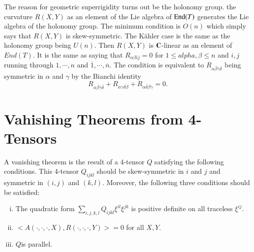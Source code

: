 The reason for geometric superrigidity turns out be the holonomy group. the curvature $R(X, Y)$ as an element of the Lie algebra of $\operatorname{End}(T)$ generates the Lie algebra of the holonomy group. The minimum condition is $O(n)$ which simply says that $R(X, Y)$ is skew-symmetric. The K\"ahler case is the same as the holonomy group being $U(n)$. Then $R(X, Y)$ is $\mathbf{C}$-linear as an element of $End(T)$. It is the same as saying that $R_{\alpha \beta ij}=0$ for $1 \leq alpha, \beta \leq n$ and $i ,j$ running through $1, \cdots, n$ and $\overline{1}, \cdots, \overline{n}$. The condition is equivalent to $R_{\alpha \overline{\beta}\gamma\overline{\delta}}$ being symmetric in $\alpha$ and $\gamma$ by the Bianchi identity
$$
R_{\alpha  \overline{\beta} \gamma \overline{\delta}} + R_{\alpha \gamma \overline{\delta}\beta} + R_{\alpha \overline{\delta}\beta \gamma} = 0.
$$

\section*{Vahishing Theorems from 4-Tensors}

A vanishing theorem is the result of a 4-tensor $Q$ satisfying the following conditions. This 4-tensor $Q_{ijkl}$ should be skew-symmetric in $i$ and $j$ and symmetric in $(i,j)$ and $(k, l)$. Moreover, the following three conditions should be satisfied:
\begin{enumerate}[(i)]
\item The quadratic form $\sum_{i,j,k,l} Q_{ijkl}\xi^{il} \xi^{jk}$ is positive definite on all traceless $\xi^{ij}$.\label{chap16-enum-i}

\item $< A(\cdot,\cdot,\cdot, X), R(\cdot,\cdot,\cdot, Y) > = 0$ for all $X, Y$.\label{chap16-enum-ii}

\item $Q$\pageoriginale is parallel.\label{chap16-enum-iii}
\end{enumerate}

